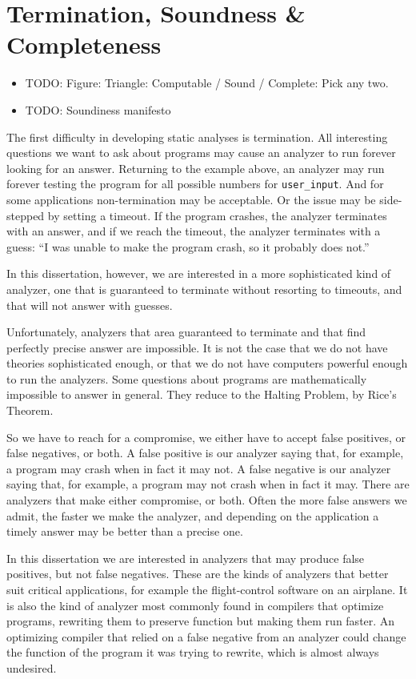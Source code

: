 \documentclass[12pt, oneside]{book}
\begin{document}
\section{Termination, Soundness \& Completeness}
\label{section:termination-soundness-and-completeness}

\begin{itemize}
  \item TODO: Figure: Triangle: Computable / Sound / Complete: Pick any two.
  \item TODO: Soundiness manifesto
\end{itemize}

The first difficulty in developing static analyses is termination. All interesting questions we want to ask about programs may cause an analyzer to run forever looking for an answer. Returning to the example above, an analyzer may run forever testing the program for all possible numbers for \texttt{user\_input}. And for some applications non-termination may be acceptable. Or the issue may be side-stepped by setting a timeout. If the program crashes, the analyzer terminates with an answer, and if we reach the timeout, the analyzer terminates with a guess: “I was unable to make the program crash, so it probably does not.”

In this dissertation, however, we are interested in a more sophisticated kind of analyzer, one that is guaranteed to terminate without resorting to timeouts, and that will not answer with guesses.

Unfortunately, analyzers that area guaranteed to terminate and that find perfectly precise answer are impossible. It is not the case that we do not have theories sophisticated enough, or that we do not have computers powerful enough to run the analyzers. Some questions about programs are mathematically impossible to answer in general. They reduce to the Halting Problem, by Rice’s Theorem.

So we have to reach for a compromise, we either have to accept false positives, or false negatives, or both. A false positive is our analyzer saying that, for example, a program may crash when in fact it may not. A false negative is our analyzer saying that, for example, a program may not crash when in fact it may. There are analyzers that make either compromise, or both. Often the more false answers we admit, the faster we make the analyzer, and depending on the application a timely answer may be better than a precise one.

In this dissertation we are interested in analyzers that may produce false positives, but not false negatives. These are the kinds of analyzers that better suit critical applications, for example the flight-control software on an airplane. It is also the kind of analyzer most commonly found in compilers that optimize programs, rewriting them to preserve function but making them run faster. An optimizing compiler that relied on a false negative from an analyzer could change the function of the program it was trying to rewrite, which is almost always undesired.
\end{document}
